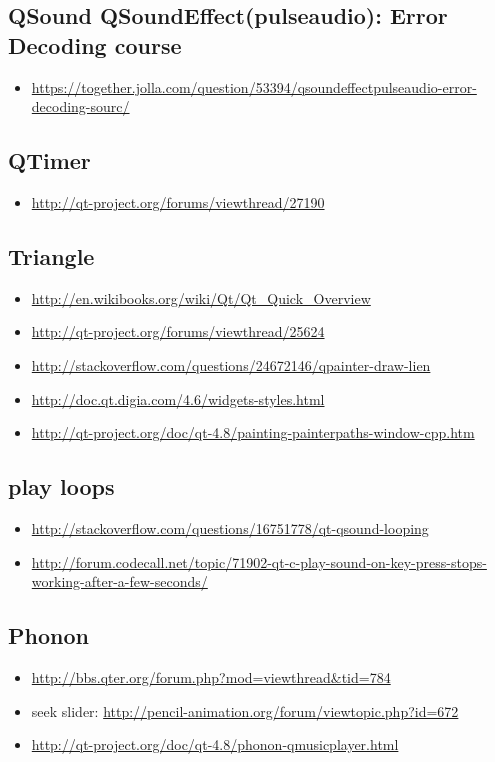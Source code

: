 \documentclass[9pt,b5paper]{article}
\begin{document}
\subsection{QSound QSoundEffect(pulseaudio): Error Decoding course}
\label{sec-14-17}
\begin{itemize}
\item \url{https://together.jolla.com/question/53394/qsoundeffectpulseaudio-error-decoding-sourc/}
\end{itemize}
\subsection{QTimer}
\label{sec-14-18}
\begin{itemize}
\item \url{http://qt-project.org/forums/viewthread/27190}
\end{itemize}
\subsection{Triangle}
\label{sec-14-19}
\begin{itemize}
\item \url{http://en.wikibooks.org/wiki/Qt/Qt_Quick_Overview}
\item \url{http://qt-project.org/forums/viewthread/25624}
\item \url{http://stackoverflow.com/questions/24672146/qpainter-draw-lien}
\item \url{http://doc.qt.digia.com/4.6/widgets-styles.html}
\item \url{http://qt-project.org/doc/qt-4.8/painting-painterpaths-window-cpp.htm}
\end{itemize}
\subsection{play loops}
\label{sec-14-20}
\begin{itemize}
\item \url{http://stackoverflow.com/questions/16751778/qt-qsound-looping}
\item \url{http://forum.codecall.net/topic/71902-qt-c-play-sound-on-key-press-stops-working-after-a-few-seconds/}
\end{itemize}
\subsection{Phonon}
\label{sec-14-21}
\begin{itemize}
\item \url{http://bbs.qter.org/forum.php?mod=viewthread&tid=784}
\item seek slider: \url{http://pencil-animation.org/forum/viewtopic.php?id=672}
\item \url{http://qt-project.org/doc/qt-4.8/phonon-qmusicplayer.html}
\end{itemize}
\end{document}
